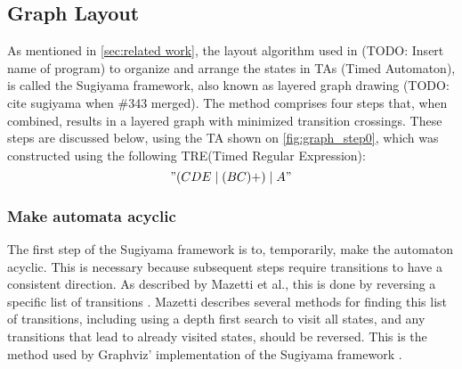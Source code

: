 \subsection{Graph Layout}\label{subsec:graphlayout}





As mentioned in \cref{sec:related work}, the layout algorithm used in (TODO: Insert name of program) to organize and arrange the states in TAs (Timed Automaton), is called the Sugiyama framework, also known as layered graph drawing (TODO: cite sugiyama when \#343 merged). The method comprises four steps that, when combined, results in a layered graph with minimized transition crossings. These steps are discussed below, using the TA shown on \cref{fig:graph_step0}, which was constructed using the following TRE(Timed Regular Expression): $$"(CDE\mid(BC)+)\mid A"$$

\begin{center}
    
\end{center}

\subsubsection{Make automata acyclic}
The first step of the Sugiyama framework is to, temporarily, make the automaton acyclic. This is necessary because subsequent steps require transitions to have a consistent direction. As described by Mazetti et al., this is done by reversing a specific list of transitions \cite{Mazetti2012}.
Mazetti describes several methods for finding this list of transitions, including using a depth first search to visit all states, and any transitions that lead to already visited states, should be reversed.
This is the method used by Graphviz' implementation of the Sugiyama framework \cite{Graphviz}. %

